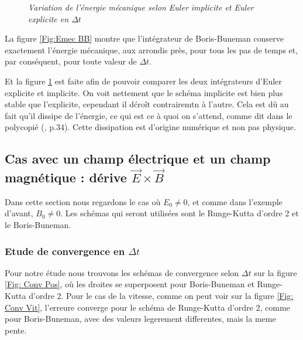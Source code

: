 \documentclass[a4paper,12pt,twoside]{article}
\begin{document}
\begin{figure}[h]
\begin{minipage}[c]{.46\linewidth}
				\caption{\em\label{Fig: Emec EI2} Variation de l'\'energie m\'ecanique selon Euler implicite et Euler explicite  en $\Delta t$}
			\end{minipage}
		\end{figure}
	
	La figure \ref{Fig:Emec BB} montre que l'int\'egrateur de Boris-Buneman conserve exactement l'\'energie m\'ecanique, aux arrondis pr\`es, pour tous les pas de temps et, par cons\'equent, pour toute valeur de $\Delta t$.
	
	Et la figure \ref{Fig: Emec EI2} est faite  afin de pouvoir comparer les deux int\'egrateurs d'Euler explicite et implicite. On voit nettement que le sch\'ema implicite est bien plus stable que l'explicite, cependant il d\'cro\^it contrairemtn \`a l'autre. Cela est d\^u au fait qu'il dissipe de l'\'energie, ce qui est ce \`a quoi on s'attend, comme dit dans le polycopi\'e (\cite{NdC}, p.34). Cette dissipation est d'origine num\'erique et non pas physique.
		
	
\subsection{Cas avec un champ \'electrique et un champ magn\'etique : d\'erive $\Vec{E}\times\Vec{B}$}
Dans cette section nous regardons le cas o\`u $E_0 \ne 0$, et comme dans l'exemple d'avant, $B_0 \ne 0$. Les sch\'emas qui seront utilis\'ees sont le Runge-Kutta d'ordre 2 et le Boris-Buneman.
	\subsubsection{Etude de convergence en $\Delta t$}
	Pour notre étude nous trouvons les sch\'emas de convergence selon $\Delta t$ sur la figure \ref{Fig: Conv Pos}, o\`u les droites se superposent pour Boris-Buneman et Runge-Kutta d'ordre 2.
	Pour le cas de la vitesse, comme on peut voir sur la figure \ref{Fig: Conv Vit}, l'erreure converge pour le sch\'ema de Runge-Kutta d'ordre 2, comme pour Boris-Buneman, avec des valeurs legerement differentes, mais la meme pente.
	
\end{document}
